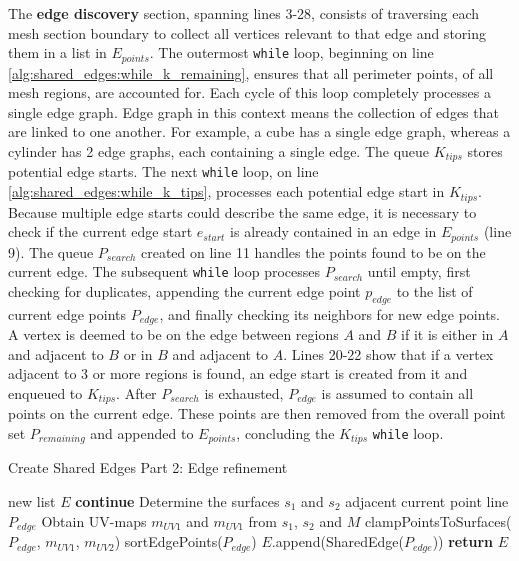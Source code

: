 The \textbf{edge discovery} section, spanning lines 3-28, consists of traversing each mesh section boundary to collect all vertices relevant to that edge and storing them in a list in $E_{points}$.
The outermost \verb|while| loop, beginning on line \ref{alg:shared_edges:while_k_remaining}, ensures that all perimeter points, of all mesh regions, are accounted for.
Each cycle of this loop completely processes a single edge graph.
Edge graph in this context means the collection of edges that are linked to one another.
For example, a cube has a single edge graph, whereas a cylinder has 2 edge graphs, each containing a single edge.
The queue $K_{tips}$ stores potential edge starts.
The next \verb|while| loop, on line \ref{alg:shared_edges:while_k_tips}, processes each potential edge start in $K_{tips}$.
Because multiple edge starts could describe the same edge, it is necessary to check if the current edge start $e_{start}$ is already contained in an edge in $E_{points}$ (line 9).
The queue $P_{search}$ created on line 11 handles the points found to be on the current edge.
The subsequent \verb|while| loop processes $P_{search}$ until empty, first checking for duplicates, appending the current edge point $p_{edge}$ to the list of current edge points $P_{edge}$, and finally checking its neighbors for new edge points.
A vertex is deemed to be on the edge between regions $A$ and $B$ if it is either in $A$ and adjacent to $B$ or in $B$ and adjacent to $A$.
Lines 20-22 show that if a vertex adjacent to 3 or more regions is found, an edge start is created from it and enqueued to $K_{tips}$.
After $P_{search}$ is exhausted, $P_{edge}$ is assumed to contain all points on the current edge.
These points are then removed from the overall point set $P_{remaining}$ and appended to $E_{points}$, concluding the $K_{tips}$ \verb|while| loop.

\begin{algorithm}[htb]
	\caption{Create Shared Edges Part 2: Edge refinement}\label{alg:shared_edges_2}
\begin{algorithmic}[1]
	\State new list $E$ 
	\label{alg:edge_refinement_for}
			\State \textbf{continue} 
		\EndIf
		\State Determine the surfaces $s_1$ and $s_2$ adjacent current point line $P_{edge}$
		\State Obtain UV-maps $m_{UV1}$ and $m_{UV1}$ from $s_1$, $s_2$ and $M$
		\State clampPointsToSurfaces($P_{edge}$, $m_{UV1}$, $m_{UV2}$)\label{alg:edge_refinement_clamp_pts}
		\State sortEdgePoints($P_{edge}$)
		\State $E$.append(SharedEdge($P_{edge}$))
	\EndFor
	\State \textbf{return} $E$
\EndFunction
\end{algorithmic}
\end{algorithm}

